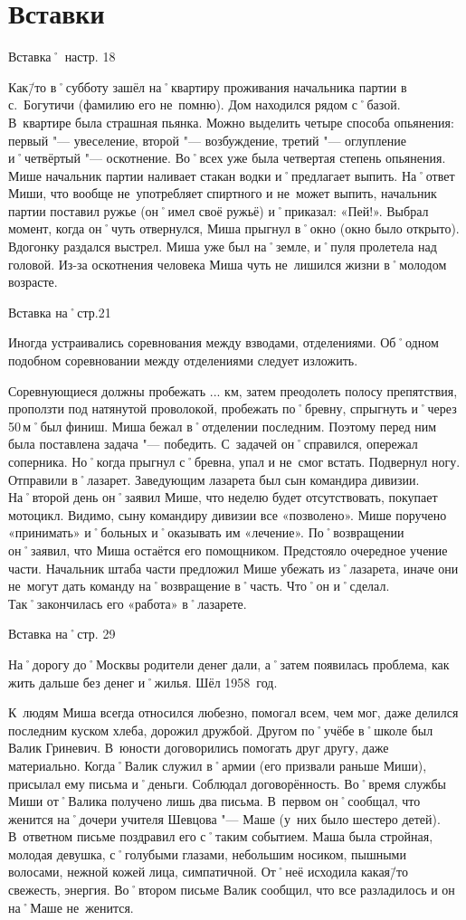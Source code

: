 ﻿\chapter{Вставки}
Вставка˚ настр. 18

Как\=/то в˚субботу зашёл на˚квартиру проживания начальника партии в с.~Богутичи (фамилию его не~помню). Дом находился рядом с˚базой. В~квартире была страшная пьянка. Можно выделить четыре способа опьянения: первый "--- увеселение, второй "--- возбуждение, третий "--- оглупление и˚четвёртый "--- оскотнение. Во˚всех уже была четвертая степень опьянения. Мише начальник партии наливает стакан водки и˚предлагает выпить. На˚ответ Миши, что вообще не~употребляет спиртного и не~может выпить, начальник партии поставил ружье (он˚имел своё ружьё) и˚приказал: «Пей!». Выбрал момент, когда он˚чуть отвернулся, Миша прыгнул в˚окно (окно было открыто). Вдогонку раздался выстрел. Миша уже был на˚земле, и˚пуля пролетела над головой. Из-за оскотнения человека Миша чуть не~лишился жизни в˚молодом возрасте.

Вставка на˚стр.21 

Иногда устраивались соревнования между взводами, отделениями. Об˚одном подобном соревновании между отделениями следует изложить.

Соревнующиеся должны пробежать ... км, затем преодолеть полосу препятствия, проползти под натянутой проволокой, пробежать по˚бревну, спрыгнуть и˚через 50\,м˚был финиш. Миша бежал в˚отделении последним. Поэтому перед ним была поставлена задача "--- победить. С~задачей он˚справился, опережал соперника. Но˚когда прыгнул с˚бревна, упал и не~смог встать. Подвернул ногу. Отправили в˚лазарет. Заведующим лазарета был сын командира дивизии. На˚второй день он˚заявил Мише, что неделю будет отсутствовать, покупает мотоцикл. Видимо, сыну командиру дивизии все «позволено». Мише поручено «принимать» и˚больных и˚оказывать им «лечение». По˚возвращении он˚заявил, что Миша остаётся его помощником. Предстояло очередное учение части. Начальник штаба части предложил Мише убежать из˚лазарета, иначе они не~могут дать команду на˚возвращение в˚часть. Что˚он и˚сделал. Так˚закончилась его «работа» в˚лазарете.

Вставка на˚стр. 29

На˚дорогу до˚Москвы родители денег дали, а˚затем появилась проблема, как жить дальше без денег и˚жилья. Шёл 1958~год.

К~людям Миша всегда относился любезно, помогал всем, чем мог, даже делился последним куском хлеба, дорожил дружбой. Другом по˚учёбе в˚школе был Валик Гриневич. В~юности договорились помогать друг другу, даже материально. Когда˚Валик служил в˚армии (его призвали раньше Миши), присылал ему письма и˚деньги. Соблюдал договорённость. Во˚время службы Миши от˚Валика получено лишь два письма. В~первом он˚сообщал, что женится на˚дочери учителя Шевцова "--- Маше (у~них было шестеро детей). В~ответном письме поздравил его с˚таким событием. Маша была стройная, молодая девушка, с˚голубыми глазами, небольшим носиком, пышными волосами, нежной кожей лица, симпатичной. От˚неё исходила какая\=/то свежесть, энергия. Во˚втором письме Валик сообщил, что все разладилось и он на˚Маше не~женится.

